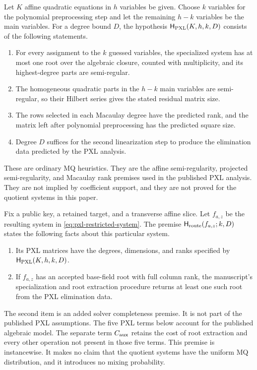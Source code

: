 \begin{definition}
\label{def:pxl-regularity}
Let $K$ affine quadratic equations in $h$ variables be given.  Choose $k$
variables for the polynomial preprocessing step and let the remaining $h-k$
variables be the main variables.  For a degree bound $D$, the hypothesis
$\mathsf H_{\rm PXL}(K,h,k,D)$ consists of the following statements.
\begin{enumerate}[label=(\roman*)]
\item For every assignment to the $k$ guessed variables, the specialized
      system has at most one root over the algebraic closure, counted with
      multiplicity, and its highest-degree parts are semi-regular.
\item The homogeneous quadratic parts in the $h-k$ main variables are
      semi-regular, so their Hilbert series gives the stated residual matrix
      size.
\item The rows selected in each Macaulay degree have the predicted rank, and
      the matrix left after polynomial preprocessing has the predicted square
      size.
\item Degree $D$ suffices for the second linearization step to produce the
      elimination data predicted by the PXL analysis.
\end{enumerate}
These are ordinary MQ heuristics.  They are the affine semi-regularity,
projected semi-regularity, and Macaulay rank premises used in the published
PXL analysis.  They are not implied by coefficient support, and they are not
proved for the quotient systems in this paper.
\end{definition}

\begin{definition}
\label{def:pxl-route}
Fix a public key, a retained target, and a transverse affine slice.  Let
$f_{a,z}$ be the resulting system in \eqref{eq:pxl-restricted-system}.  The
premise $\mathsf H_{\rm route}(f_{a,z};k,D)$ states the following facts about
this particular system.
\begin{enumerate}[label=(\roman*)]
\item Its PXL matrices have the degrees, dimensions, and ranks specified by
      $\mathsf H_{\rm PXL}(K,h,k,D)$.
\item If $f_{a,z}$ has an accepted base-field root with full column rank, the
      manuscript's specialization and root extraction procedure returns at
      least one such root from the PXL elimination data.
\end{enumerate}
The second item is an added solver completeness premise.  It is not part of
the published PXL assumptions.  The five PXL terms below account for the
published algebraic model.  The separate term $C_{\rm aux}$ retains the cost
of root extraction and every other operation not present in those five terms.
This premise is instancewise.  It makes no claim that the quotient systems
have the uniform MQ distribution, and it introduces no mixing probability.
\end{definition}

